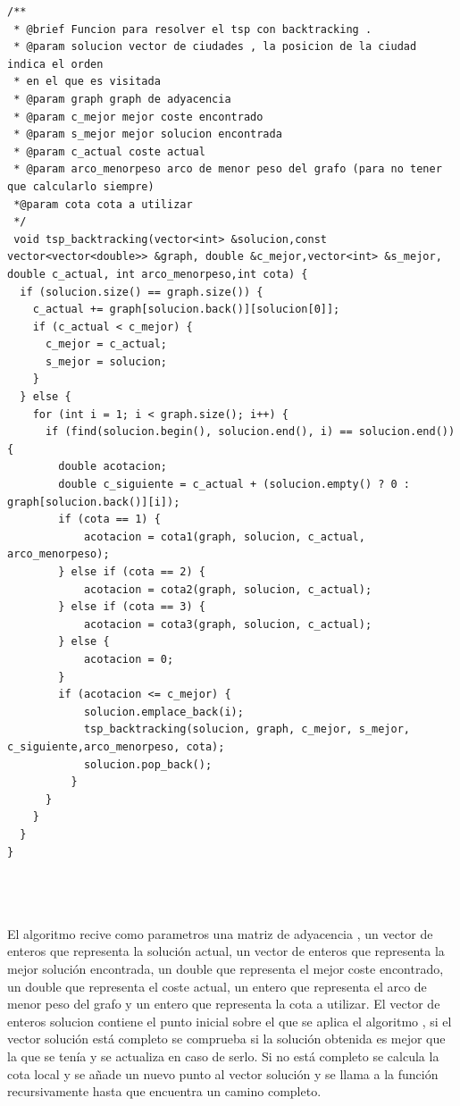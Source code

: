 \documentclass[11pt,openany]{book}
\begin{document}
\begin{lstlisting}
/**
 * @brief Funcion para resolver el tsp con backtracking .
 * @param solucion vector de ciudades , la posicion de la ciudad indica el orden
 * en el que es visitada
 * @param graph graph de adyacencia
 * @param c_mejor mejor coste encontrado
 * @param s_mejor mejor solucion encontrada
 * @param c_actual coste actual
 * @param arco_menorpeso arco de menor peso del grafo (para no tener que calcularlo siempre)
 *@param cota cota a utilizar
 */
 void tsp_backtracking(vector<int> &solucion,const vector<vector<double>> &graph, double &c_mejor,vector<int> &s_mejor, double c_actual, int arco_menorpeso,int cota) {
  if (solucion.size() == graph.size()) {
    c_actual += graph[solucion.back()][solucion[0]];
    if (c_actual < c_mejor) {
      c_mejor = c_actual;
      s_mejor = solucion;
    }
  } else {
    for (int i = 1; i < graph.size(); i++) {
      if (find(solucion.begin(), solucion.end(), i) == solucion.end()) {
        double acotacion;
        double c_siguiente = c_actual + (solucion.empty() ? 0 : graph[solucion.back()][i]);
        if (cota == 1) {
            acotacion = cota1(graph, solucion, c_actual, arco_menorpeso);
        } else if (cota == 2) {
            acotacion = cota2(graph, solucion, c_actual);
        } else if (cota == 3) {
            acotacion = cota3(graph, solucion, c_actual);
        } else {
            acotacion = 0;
        }
        if (acotacion <= c_mejor) {
            solucion.emplace_back(i);
            tsp_backtracking(solucion, graph, c_mejor, s_mejor, c_siguiente,arco_menorpeso, cota);
            solucion.pop_back();
          }
      }
    }
  }
}

  
                
    \end{lstlisting}
    El algoritmo recive como parametros una matriz de adyacencia , un vector de enteros que representa la solución actual, un vector de enteros que representa la mejor solución encontrada, un double que representa el mejor coste encontrado, un double que representa el coste actual, un entero que representa el arco de menor peso del grafo y un entero que representa la cota a utilizar.
    El vector de enteros solucion contiene el punto inicial sobre el que se aplica el algoritmo , si el vector solución está completo se comprueba si 
    la solución obtenida es mejor que la que se tenía y se actualiza en caso de serlo. Si no está completo se calcula la cota local y se  añade un nuevo punto al vector solución y se llama a la función recursivamente hasta que encuentra un camino completo.
    
\end{document}
